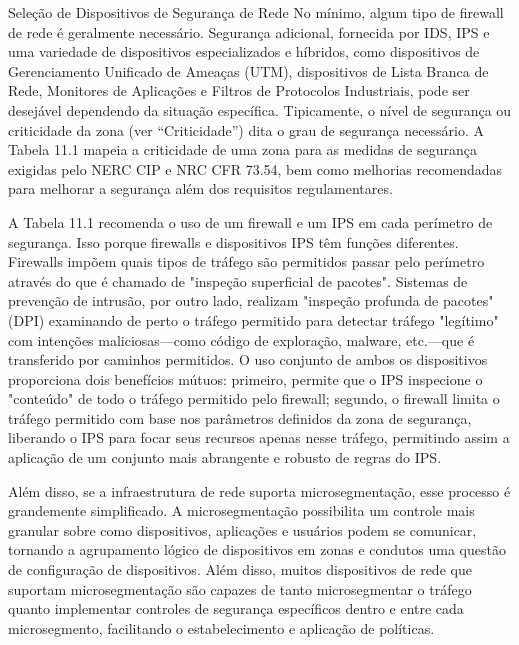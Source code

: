 Seleção de Dispositivos de Segurança de Rede
No mínimo, algum tipo de firewall de rede é geralmente necessário. Segurança adicional, fornecida por IDS, IPS e uma variedade de dispositivos especializados e híbridos, como dispositivos de Gerenciamento Unificado de Ameaças (UTM), dispositivos de Lista Branca de Rede, Monitores de Aplicações e Filtros de Protocolos Industriais, pode ser desejável dependendo da situação específica. Tipicamente, o nível de segurança ou criticidade da zona (ver “Criticidade”) dita o grau de segurança necessário. A Tabela 11.1 mapeia a criticidade de uma zona para as medidas de segurança exigidas pelo NERC CIP e NRC CFR 73.54, bem como melhorias recomendadas para melhorar a segurança além dos requisitos regulamentares.

A Tabela 11.1 recomenda o uso de um firewall e um IPS em cada perímetro de segurança. Isso porque firewalls e dispositivos IPS têm funções diferentes. Firewalls impõem quais tipos de tráfego são permitidos passar pelo perímetro através do que é chamado de "inspeção superficial de pacotes". Sistemas de prevenção de intrusão, por outro lado, realizam "inspeção profunda de pacotes" (DPI) examinando de perto o tráfego permitido para detectar tráfego "legítimo" com intenções maliciosas—como código de exploração, malware, etc.—que é transferido por caminhos permitidos. O uso conjunto de ambos os dispositivos proporciona dois benefícios mútuos: primeiro, permite que o IPS inspecione o "conteúdo" de todo o tráfego permitido pelo firewall; segundo, o firewall limita o tráfego permitido com base nos parâmetros definidos da zona de segurança, liberando o IPS para focar seus recursos apenas nesse tráfego, permitindo assim a aplicação de um conjunto mais abrangente e robusto de regras do IPS.

Além disso, se a infraestrutura de rede suporta microsegmentação, esse processo é grandemente simplificado. A microsegmentação possibilita um controle mais granular sobre como dispositivos, aplicações e usuários podem se comunicar, tornando a agrupamento lógico de dispositivos em zonas e condutos uma questão de configuração de dispositivos. Além disso, muitos dispositivos de rede que suportam microsegmentação são capazes de tanto microsegmentar o tráfego quanto implementar controles de segurança específicos dentro e entre cada microsegmento, facilitando o estabelecimento e aplicação de políticas.

